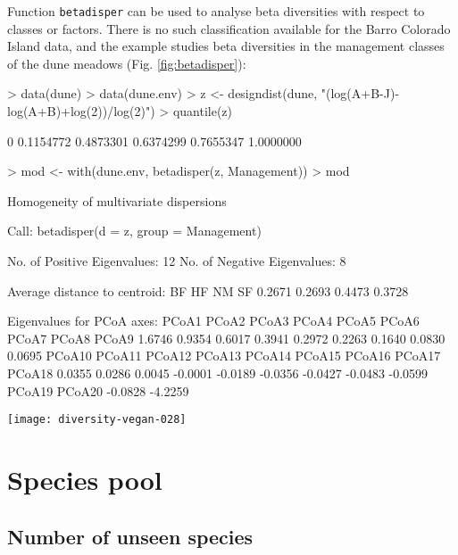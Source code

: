 \documentclass[a4paper,10pt]{amsart}
\begin{document}
Function \texttt{betadisper} can be used to analyse beta diversities
with respect to classes or factors.  There is no such classification
available for the Barro Colorado Island data, and the example studies
beta diversities in the management classes of the dune meadows
(Fig. \ref{fig:betadisper}):
\begin{Schunk}
\begin{Sinput}
> data(dune)
> data(dune.env)
> z <- designdist(dune, "(log(A+B-J)-log(A+B)+log(2))/log(2)")
> quantile(z)
\end{Sinput}
\begin{Soutput}
       0%       25%       50%       75%      100% 
0.1154772 0.4873301 0.6374299 0.7655347 1.0000000 
\end{Soutput}
\begin{Sinput}
> mod <- with(dune.env, betadisper(z, Management))
> mod
\end{Sinput}
\begin{Soutput}
	Homogeneity of multivariate dispersions

Call: betadisper(d = z, group = Management)

No. of Positive Eigenvalues: 12
No. of Negative Eigenvalues: 8

Average distance to centroid:
    BF     HF     NM     SF 
0.2671 0.2693 0.4473 0.3728 

Eigenvalues for PCoA axes:
  PCoA1   PCoA2   PCoA3   PCoA4   PCoA5   PCoA6   PCoA7   PCoA8   PCoA9 
 1.6746  0.9354  0.6017  0.3941  0.2972  0.2263  0.1640  0.0830  0.0695 
 PCoA10  PCoA11  PCoA12  PCoA13  PCoA14  PCoA15  PCoA16  PCoA17  PCoA18 
 0.0355  0.0286  0.0045 -0.0001 -0.0189 -0.0356 -0.0427 -0.0483 -0.0599 
 PCoA19  PCoA20 
-0.0828 -4.2259 
\end{Soutput}
\end{Schunk}
\begin{SCfigure}
\texttt{[image: diversity-vegan-028]}
\caption{Box plots of beta diversity measured as the average steepness
  ($z$) of the species area curve in the Arrhenius model $S = cX^z$ in
  Management classes of dune meadows.}
\label{fig:betadisper}
\end{SCfigure}

\section{Species pool}
\subsection{Number of unseen species}
\end{document}
